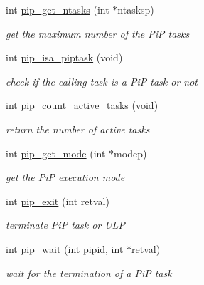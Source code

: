 \begin{DoxyCompactItemize}
\item 
int \hyperlink{group__libpip_ga9786d5aafa2a3882714c35ecc9f39a5a}{pip\-\_\-get\-\_\-ntasks} (int $\ast$ntasksp)
\begin{DoxyCompactList}\small\item\em get the maximum number of the Pi\-P tasks \end{DoxyCompactList}\end{DoxyCompactItemize}
\begin{DoxyCompactItemize}
\item 
int \hyperlink{group__libpip_ga4b6905e1eb5ffa6427d72d7e73408639}{pip\-\_\-isa\-\_\-piptask} (void)
\begin{DoxyCompactList}\small\item\em check if the calling task is a Pi\-P task or not \end{DoxyCompactList}\end{DoxyCompactItemize}
\begin{DoxyCompactItemize}
\item 
int \hyperlink{group__libpip_gac45cbabfd20fa2f8f4e9004474922137}{pip\-\_\-count\-\_\-active\-\_\-tasks} (void)
\begin{DoxyCompactList}\small\item\em return the number of active tasks \end{DoxyCompactList}\end{DoxyCompactItemize}
\begin{DoxyCompactItemize}
\item 
int \hyperlink{group__libpip_gab603f68c1ce972a5f3bfb8c95fcfb555}{pip\-\_\-get\-\_\-mode} (int $\ast$modep)
\begin{DoxyCompactList}\small\item\em get the Pi\-P execution mode \end{DoxyCompactList}\end{DoxyCompactItemize}
\begin{DoxyCompactItemize}
\item 
int \hyperlink{group__libpip_gaf9be37d927121b9327b5fca2417ccec2}{pip\-\_\-exit} (int retval)
\begin{DoxyCompactList}\small\item\em terminate Pi\-P task or U\-L\-P \end{DoxyCompactList}\end{DoxyCompactItemize}
\begin{DoxyCompactItemize}
\item 
int \hyperlink{group__libpip_ga3adad6a3e2311a46b2bfdd9d9062811b}{pip\-\_\-wait} (int pipid, int $\ast$retval)
\begin{DoxyCompactList}\small\item\em wait for the termination of a Pi\-P task \end{DoxyCompactList}\end{DoxyCompactItemize}
